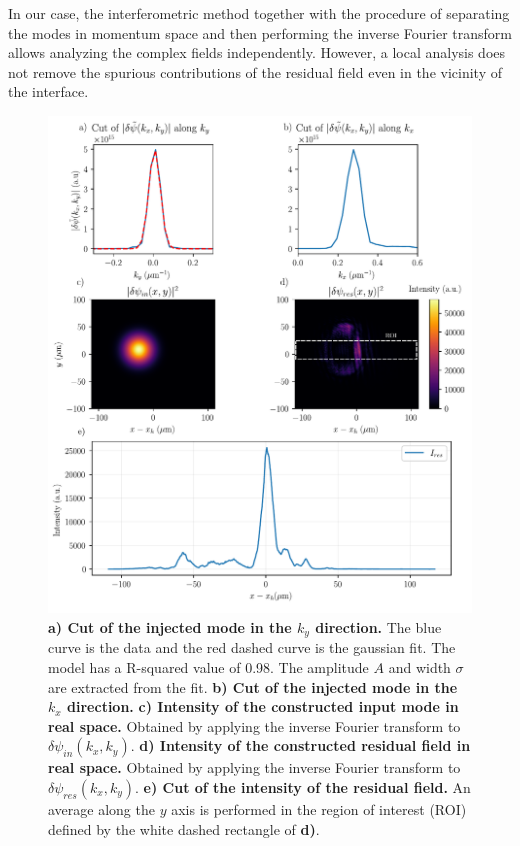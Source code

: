 In our case, the interferometric method together with the procedure of separating the modes in momentum space and then performing the inverse Fourier transform allows analyzing the complex fields independently. However, a local analysis does not remove the spurious contributions of the residual field even in the vicinity of the interface.


\begin{figure}
    \centering
    \includegraphics[width=1\textwidth]{chap_stimulated_hawking/fig/fit_input_mode.pdf}
    \caption{\textbf{a) Cut of the injected mode in the $k_y$ direction.} The blue curve is the data and the red dashed curve is the gaussian fit. The model has a R-squared value of 0.98. The amplitude $A$ and width $\sigma$ are extracted from the fit. 
    \textbf{b) Cut of the injected mode in the $k_x$ direction.}
    \textbf{c) Intensity of the constructed input mode in real space.} Obtained by applying the inverse Fourier transform to $\delta \psi_{in}(k_x,k_y)$.
    \textbf{d) Intensity of the constructed residual field in real space.} Obtained by applying the inverse Fourier transform to $\delta \psi_{res}(k_x,k_y)$.
    \textbf{e) Cut of the intensity of the residual field.} An average along the $y$ axis is performed in the region of interest (ROI) defined by the white dashed rectangle of \textbf{d)}.}
    \label{fig:fit_input_mode}
\end{figure}


